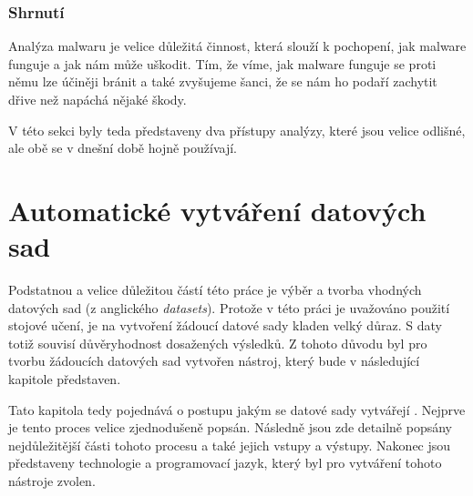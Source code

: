 \subsection*{Shrnutí}
Analýza malwaru je velice důležitá činnost, která slouží k pochopení, jak malware funguje a jak nám může uškodit. Tím, že víme, jak malware funguje se proti němu lze účiněji bránit a také zvyšujeme šanci, že se nám ho 
podaří zachytit dřive než napáchá nějaké škody. 

V této sekci byly teda představeny dva přístupy analýzy, které jsou velice odlišné, ale obě se v dnešní době hojně používají.


\chapter{Automatické vytváření datových sad} \label{3.chap}

Podstatnou a velice důležitou částí této práce je výběr a tvorba vhodných datových sad (z anglického \textit{datasets}).
Protože v této práci je uvažováno použití stojové učení, je na vytvoření žádoucí datové sady kladen velký důraz. 
S daty totiž souvisí důvěryhodnost dosažených výsledků.
Z tohoto důvodu byl pro tvorbu žádoucích datových sad vytvořen nástroj, který bude v následující kapitole představen. 

Tato kapitola tedy pojednává o postupu jakým se datové sady vytvářejí . Nejprve je tento proces velice zjednodušeně popsán.
Následně jsou zde detailně popsány nejdůležitější části tohoto procesu a také jejich vstupy a výstupy.
Nakonec jsou představeny technologie a programovací jazyk, který byl pro vytváření tohoto nástroje zvolen. 

